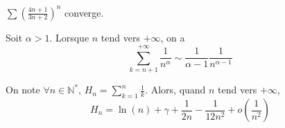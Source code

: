 
  \begin{example}
    $\sum \left( \frac{4n+1}{3n+2} \right)^{n}$ converge.
  \end{example}


  \begin{lemma}
    Soit $\alpha > 1$. Lorsque $n$ tend vers $+\infty$, on a
    \[ \sum_{k=n+1}^{+\infty} \frac{1}{n^\alpha} \sim \frac{1}{\alpha - 1} \frac{1}{n^{\alpha - 1}} \]
  \end{lemma}


  \begin{proposition}
    On note $\forall n \in \mathbb{N}^*, \, H_n = \sum_{k=1}^{n} \frac{1}{k}$. Alors, quand $n$ tend vers $+\infty$,
    \[ H_n = \ln(n) + \gamma + \frac{1}{2n} - \frac{1}{12n^2} + o\left( \frac{1}{n^2} \right) \]
  \end{proposition}

